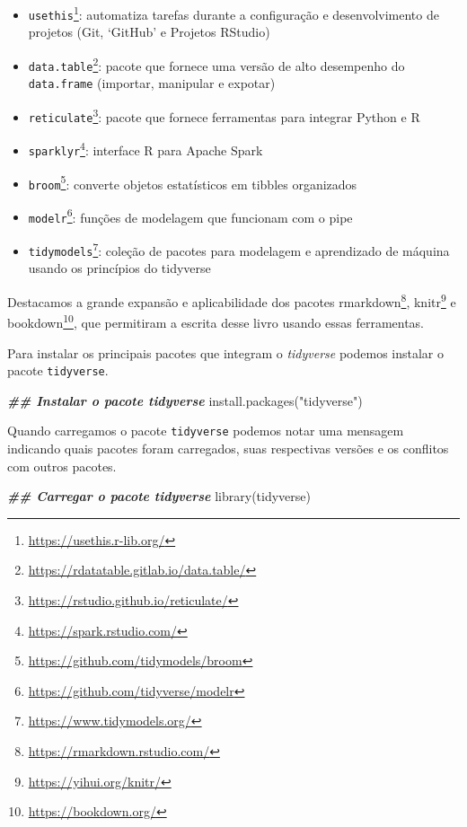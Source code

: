 \documentclass[
]{book}
\newenvironment{Shaded}{\begin{snugshade}}{\end{snugshade}}
\newcommand{\DocumentationTok}[1]{\textcolor[rgb]{0.37,0.37,0.37}{\textbf{\textit{#1}}}}
\newcommand{\FunctionTok}[1]{\textcolor[rgb]{0,0,0}{#1}}
\newcommand{\NormalTok}[1]{#1}
\newcommand{\StringTok}[1]{\textcolor[rgb]{0.5,0.5,0.5}{#1}}
\renewcommand{\href}[2]{#2\footnote{\url{#1}}}
\begin{document}
\begin{itemize}
  \href{https://here.r-lib.org/}{\texttt{here}}: facilita a definição de diretórios
\item
  \href{https://usethis.r-lib.org/}{\texttt{usethis}}: automatiza tarefas durante a configuração e desenvolvimento de projetos (Git, `GitHub' e Projetos RStudio)
\item
  \href{https://rdatatable.gitlab.io/data.table/}{\texttt{data.table}}: pacote que fornece uma versão de alto desempenho do \texttt{data.frame} (importar, manipular e expotar)
\item
  \href{https://rstudio.github.io/reticulate/}{\texttt{reticulate}}: pacote que fornece ferramentas para integrar Python e R
\item
  \href{https://spark.rstudio.com/}{\texttt{sparklyr}}: interface R para Apache Spark
\item
  \href{https://github.com/tidymodels/broom}{\texttt{broom}}: converte objetos estatísticos em tibbles organizados
\item
  \href{https://github.com/tidyverse/modelr}{\texttt{modelr}}: funções de modelagem que funcionam com o pipe
\item
  \href{https://www.tidymodels.org/}{\texttt{tidymodels}}: coleção de pacotes para modelagem e aprendizado de máquina usando os princípios do tidyverse
\end{itemize}

Destacamos a grande expansão e aplicabilidade dos pacotes \href{https://rmarkdown.rstudio.com/}{rmarkdown}, \href{https://yihui.org/knitr/}{knitr} e \href{https://bookdown.org/}{bookdown}, que permitiram a escrita desse livro usando essas ferramentas.

Para instalar os principais pacotes que integram o \emph{tidyverse} podemos instalar o pacote \texttt{tidyverse}.

\begin{Shaded}
\begin{Highlighting}[]
\DocumentationTok{\#\# Instalar o pacote tidyverse}
\FunctionTok{install.packages}\NormalTok{(}\StringTok{"tidyverse"}\NormalTok{)}
\end{Highlighting}
\end{Shaded}

Quando carregamos o pacote \texttt{tidyverse} podemos notar uma mensagem indicando quais pacotes foram carregados, suas respectivas versões e os conflitos com outros pacotes.

\begin{Shaded}
\begin{Highlighting}[]
\DocumentationTok{\#\# Carregar o pacote tidyverse}
\FunctionTok{library}\NormalTok{(tidyverse)}
\end{Highlighting}
\end{Shaded}
\end{document}

